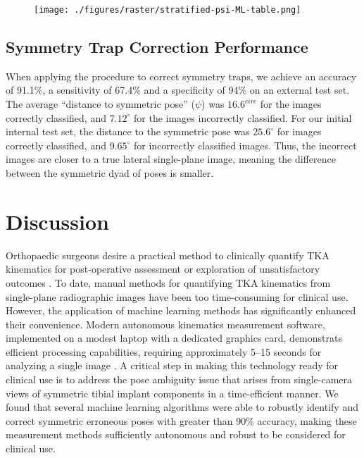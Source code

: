 \begin{figure}
  \centering
  \texttt{[image: ./figures/raster/stratified-psi-ML-table.png]}
\end{figure}

\subsection{Symmetry Trap Correction Performance}
When applying the procedure to correct symmetry traps, we achieve an accuracy of 91.1\%, a sensitivity of 67.4\% and a specificity of 94\% on an external test set.
The average “distance to symmetric pose” ($\psi$) was $16.6^{circ}$ for the images correctly classified, and $7.12^{\circ}$ for the images incorrectly classified.
For our initial internal test set, the distance to the symmetric pose was $25.6^{\circ}$ for images correctly classified, and $9.65^{\circ}$ for incorrectly classified images.
Thus, the incorrect images are closer to a true lateral single-plane image, meaning the difference between the symmetric dyad of poses is smaller.

\section{Discussion}
Orthopaedic surgeons desire a practical method to clinically quantify TKA kinematics for post-operative assessment or exploration of unsatisfactory outcomes \cite{banksWhatPostoperativeOutcome2017}.
To date, manual methods for quantifying TKA kinematics from single-plane radiographic images have been too time-consuming for clinical use. However, the application of machine learning methods has significantly enhanced their convenience\cite{jensenJointTrackMachine2023}.
Modern autonomous kinematics measurement software, implemented on a modest laptop with a dedicated graphics card, demonstrats efficient processing capabilities, requiring approximately 5–15 seconds for analyzing a single image \cite{jensenJointTrackMachine2023}.
A critical step in making this technology ready for clinical use is to address the pose ambiguity issue that arises from single-camera views of symmetric tibial implant components in a time-efficient manner.
We found that several machine learning algorithms were able to robustly identify and correct symmetric erroneous poses with greater than 90\% accuracy, making these measurement methods sufficiently autonomous and robust to be considered for clinical use.

